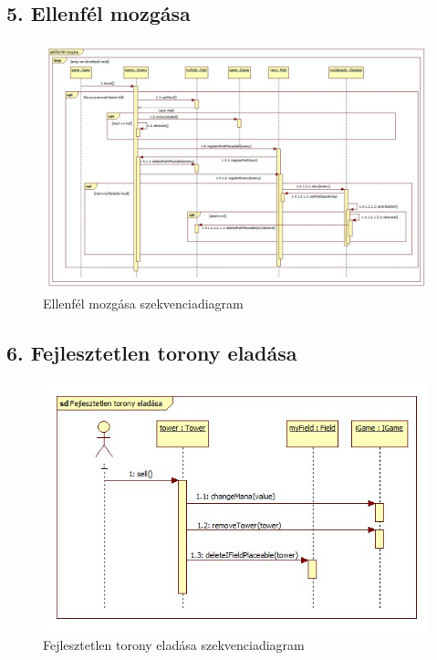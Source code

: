 \subsection{5. Ellenfél mozgása}
\begin{figure}[H]
\begin{center}
\includegraphics[width=17cm]{chapters/chapter05/images/sd_Ellenfel_mozgasa.jpg}
\caption{Ellenfél mozgása szekvenciadiagram}
\label{fig:sd_Ellenfel_mozgasa}
\end{center}
\end{figure}

\subsection{6. Fejlesztetlen torony eladása}
\begin{figure}[H]
\begin{center}
\includegraphics[width=17cm]{chapters/chapter05/images/sd_Fejlesztetlen_torony_eladasa.jpg}
\caption{Fejlesztetlen torony eladása szekvenciadiagram}
\label{fig:sd_Fejlesztetlen_torony_eladasa}
\end{center}
\end{figure}


